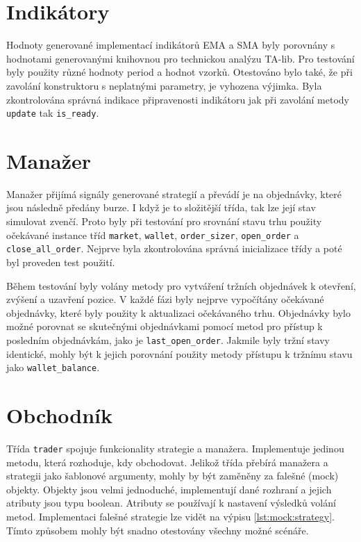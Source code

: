 \section{Indikátory}
Hodnoty generované implementací indikátorů EMA a SMA byly porovnány s hodnotami generovanými knihovnou pro technickou analýzu TA-lib.
Pro testování byly použity různé hodnoty period a hodnot vzorků.
Otestováno bylo také, že při zavolání konstruktoru s neplatnými parametry, je vyhozena výjimka.
Byla zkontrolována správná indikace připravenosti indikátoru jak při zavolání metody \texttt{update} tak \texttt{is\_ready}.

\section{Manažer}
Manažer přijímá signály generované strategií a převádí je na objednávky, které jsou následně předány burze.
I když je to složitější třída, tak lze její stav simulovat zvenčí.
Proto byly při testování pro srovnání stavu trhu použity očekávané instance tříd \texttt{market}, \texttt{wallet}, \texttt{order\_sizer}, \texttt{open\_order} a \texttt{close\_all\_order}.
Nejprve byla zkontrolována správná inicializace třídy a poté byl proveden test použití.

Během testování byly volány metody pro vytváření tržních objednávek k otevření, zvýšení a uzavření pozice.
V každé fázi byly nejprve vypočítány očekávané objednávky, které byly použity k aktualizaci očekávaného trhu.
Objednávky bylo možné porovnat se skutečnými objednávkami pomocí metod pro přístup k posledním objednávkám, jako je \texttt{last\_open\_order}.
Jakmile byly tržní stavy identické, mohly být k jejich porovnání použity metody přístupu k tržnímu stavu jako \texttt{wallet\_balance}.

\section{Obchodník}
Třída \texttt{trader} spojuje funkcionality strategie a manažera.
Implementuje jedinou metodu, která rozhoduje, kdy obchodovat.
Jelikož třída přebírá manažera a strategii jako šablonové argumenty, mohly by být zaměněny za falešné (mock) objekty.
Objekty jsou velmi jednoduché, implementují dané rozhraní a jejich atributy jsou typu boolean.
Atributy se používají k nastavení výsledků volání metod.
Implementaci falešné strategie lze vidět na výpisu \ref{lst:mock:strategy}.
Tímto způsobem mohly být snadno otestovány všechny možné scénáře.

